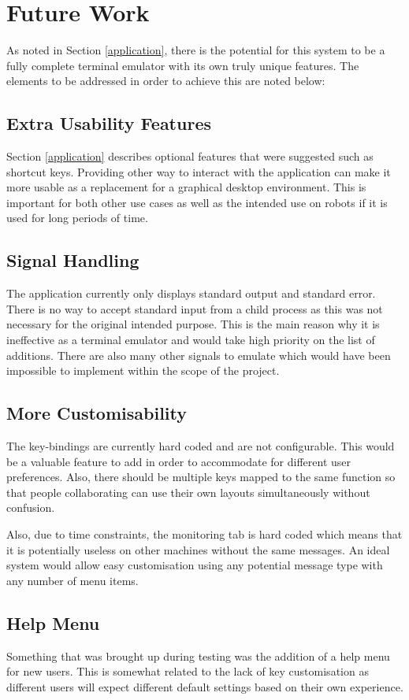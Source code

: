 \section{Future Work}

As noted in Section \ref{application}, there is the potential for this system to be a fully complete terminal emulator with its own truly unique features. The elements to be addressed in order to achieve this are noted below:

\subsection{Extra Usability Features}

Section \ref{application} describes optional features that were suggested such as shortcut keys. Providing other way to interact with the application can make it more usable as a replacement for a graphical desktop environment. This is important for both other use cases as well as the intended use on robots if it is used for long periods of time.

\subsection{Signal Handling}

The application currently only displays standard output and standard error. There is no way to accept standard input from a child process as this was not necessary for the original intended purpose. This is the main reason why it is ineffective as a terminal emulator and would take high priority on the list of additions. There are also many other signals to emulate which would have been impossible to implement within the scope of the project.

\subsection{More Customisability}

The key-bindings are currently hard coded and are not configurable. This would be a valuable feature to add in order to accommodate for different user preferences. Also, there should be multiple keys mapped to the same function so that people collaborating can use their own layouts simultaneously without confusion.

Also, due to time constraints, the monitoring tab is hard coded which means that it is potentially useless on other machines without the same messages. An ideal system would allow easy customisation using any potential message type with any number of menu items.

\subsection{Help Menu}

Something that was brought up during testing was the addition of a help menu for new users. This is somewhat related to the lack of key customisation as different users will expect different default settings based on their own experience.
